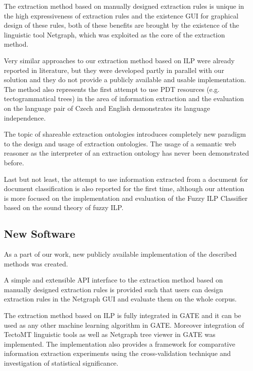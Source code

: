 The extraction method based on manually designed extraction rules is unique in the high expressiveness of extraction rules and the existence GUI for graphical design of these rules, both of these benefits are brought by the existence of the linguistic tool Netgraph, which was exploited as the core of the extraction method.

Very similar approaches to our extraction method based on ILP were already reported in literature, but they were developed partly in parallel with our solution and they do not provide a publicly available and usable implementation. The method also represents the first attempt to use PDT resources (e.g. tectogrammatical trees) in the area of information extraction and the evaluation on the language pair of Czech and English demonstrates its language independence.

The topic of shareable extraction ontologies introduces completely new paradigm to the design and usage of extraction ontologies. The usage of a semantic web reasoner as the interpreter of an extraction ontology has never been demonstrated before.

Last but not least, the attempt to use information extracted from a document for document classification is also reported for the first time, although our attention is more focused on the implementation and evaluation of the Fuzzy ILP Classifier based on the sound theory of fuzzy ILP.



\subsection{New Software}

As a part of our work, new publicly available implementation of the described methods was created. 

A simple and extensible API interface to the extraction method based on manually designed extraction rules is provided such that users can design extraction rules in the Netgraph GUI and evaluate them on the whole corpus. 

The extraction method based on ILP is fully integrated in GATE and it can be used as any other machine learning algorithm in GATE. Moreover integration of TectoMT linguistic tools as well as Netgraph tree viewer in GATE was implemented. The implementation also provides a framework for  comparative information extraction experiments using the cross-validation technique and investigation of statistical significance. 


